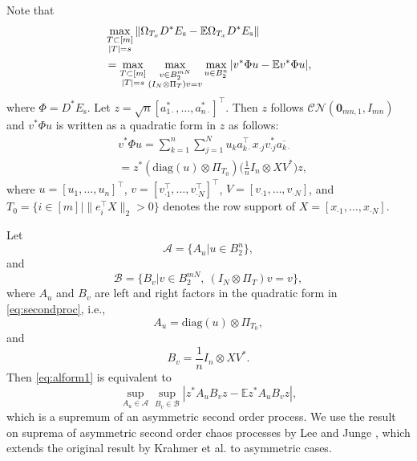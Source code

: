\documentclass[11pt,journal]{IEEEtran}
\newcommand{\bbE}{\mathbb{E}}
\newcommand{\rms}{\mathrm{s}}
\newcommand{\calCN}{\mathcal{CN}}
\newcommand{\norm}[1]{\|{#1}\|}
\newcommand{\T}{\top}
\begin{document}
\begin{IEEEproof}
Note that
\begin{align}
& \max_{\begin{subarray}{c} T \subset [m] \\ |T| = s \end{subarray}}\norm{\Omega_{T_x}D^*E_\rms-\bbE \Omega_{T_x}D^*E_\rms}   \nonumber\\
& = \max_{\begin{subarray}{c} T \subset [m] \\ |T| = s \end{subarray}} 
\max_{\begin{subarray}{c} v \in B_2^{mN} \\ (I_N \otimes \Pi_T) v = v \end{subarray}} \max_{u \in B_2^n} |v^* \Phi u - \mathbb{E} v^* \Phi u|, \label{eq:alform1}
\end{align}
where $\Phi = D^*E_\rms$. Let ${z} = \sqrt{n} [a_{1\cdot}^*,\dots,a_{n\cdot}^*]^\T$. Then ${z}$ follows $\calCN(\bm{0}_{mn,1},I_{mn})$ and $v^* \Phi u$ is written as a quadratic form in ${z}$ as follows:
\begin{align}
& v^* \Phi u 
= \sum_{k=1}^n \sum_{j=1}^N u_k a_{k\cdot}^\T x_{\cdot j} v_{\cdot j}^* \overline{a_{k\cdot}}  \nonumber\\
& = {z}^* (\mathrm{diag}(u) \otimes \Pi_{T_0}) 
\Big(\frac{1}{n} I_n \otimes X V^*\Big) {z},  \label{eq:secondproc}
\end{align}
where $u = [u_1,\dots,u_n]^\T$, $v=[v_{\cdot 1}^\T,\dots,v_{\cdot N}^\T]^\T$, $V=[v_{\cdot 1},\dots, v_{\cdot N}]$, and $T_0 = \{i\in[m] | \norm{e_i^\T X}_2 > 0 \}$ denotes the row support of $X = [x_{\cdot 1},\dots,x_{\cdot N}]$. %

Let
\[
\mathcal{A} = \{ A_{u} | u \in B_2^n \},
\]
and
\[
\mathcal{B} = \{ B_{v} | v \in B_2^{mN}, ~ (I_N \otimes \Pi_T) v = v \},
\]
where $A_u$ and $B_v$ are left and right factors in the quadratic form in \eqref{eq:secondproc}, i.e.,
\[
A_{u} = \mathrm{diag}(u) \otimes \Pi_{T_0},
\]
and
\[
B_{v} = \frac{1}{n} I_n \otimes X V^*.
\]
Then \eqref{eq:alform1} is equivalent to
\[
\sup_{A_u \in \mathcal{A}} \sup_{B_v \in \mathcal{B}} 
|{z}^* A_u B_v {z} - \mathbb{E} {z}^* A_u B_v {z}|,
\]
which is a supremum of an asymmetric second order process. 
We use the result on suprema of asymmetric second order chaos processes by Lee and Junge \cite[Theorem 2.3]{Lee2015b}, which extends the original result by Krahmer et al. \cite{Krahmer2014} to asymmetric cases.


\end{IEEEproof}
\end{document}
